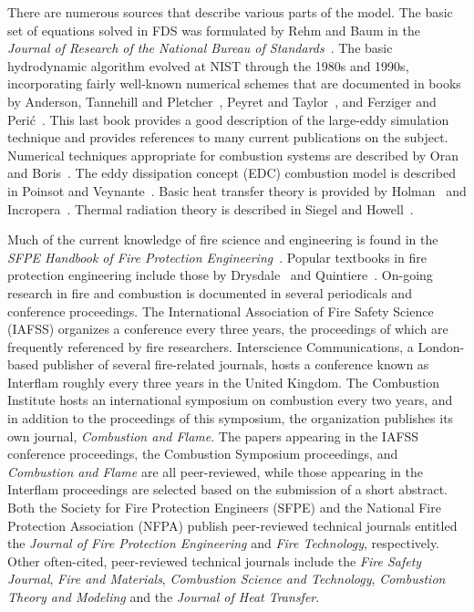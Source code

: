 \documentclass[11pt]{book}
\begin{document}
There are numerous sources that describe various parts of the model. The basic set of equations solved in FDS was formulated by Rehm and Baum in the {\em Journal of Research of the National Bureau of Standards}~\cite{Rehm:1}.  The basic hydrodynamic algorithm evolved at NIST through the 1980s and 1990s, incorporating fairly well-known numerical schemes that are documented in books by Anderson, Tannehill and Pletcher~\cite{Anderson:1}, Peyret and Taylor~\cite{Peyret:1}, and Ferziger and Peri\'{c}~\cite{Ferziger:1}. This last book provides a good description of the large-eddy simulation technique and provides references to many current publications on the subject.  Numerical techniques appropriate for combustion systems are described by Oran and Boris~\cite{Oran:1}.  The eddy dissipation concept (EDC) combustion model is described in Poinsot and Veynante~\cite{Poinsot:TNC}. Basic heat transfer theory is provided by Holman~\cite{Holman:1} and Incropera~\cite{Incropera:1}. Thermal radiation theory is described in Siegel and Howell~\cite{Siegel:1}.

Much of the current knowledge of fire science and engineering is found in the {\em SFPE Handbook of Fire Protection Engineering}~\cite{SFPE}. Popular textbooks in fire protection engineering include those by Drysdale~\cite{Drysdale:1} and Quintiere~\cite{Quintiere:2}. On-going research in fire and combustion is documented in several periodicals and conference proceedings. The International Association of Fire Safety Science (IAFSS) organizes a conference every three years, the proceedings of which are frequently referenced by fire researchers. Interscience Communications, a London-based publisher of several fire-related journals, hosts a conference known as Interflam roughly every three years in the United Kingdom. The Combustion Institute hosts an international symposium on combustion every two years, and in addition to the proceedings of this symposium, the organization publishes its own journal, {\em Combustion and Flame}. The papers appearing in the IAFSS conference proceedings, the Combustion Symposium proceedings, and {\em Combustion and Flame} are all peer-reviewed, while those appearing in the Interflam proceedings are selected based on the submission of a short abstract. Both the Society for Fire Protection Engineers (SFPE) and the National Fire Protection Association (NFPA) publish peer-reviewed technical journals entitled the {\em Journal of Fire Protection Engineering} and {\em Fire Technology}, respectively. Other often-cited, peer-reviewed technical journals include the {\em Fire Safety Journal}, {\em Fire and Materials}, {\em Combustion Science and Technology}, {\em Combustion Theory and Modeling} and the {\em Journal of Heat Transfer}.
\end{document}
